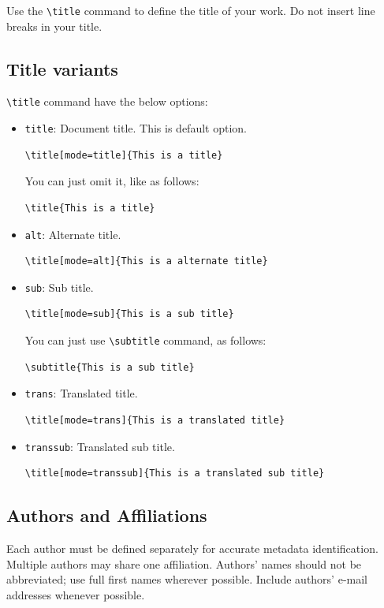 \documentclass[
]{ceurart}
\begin{document}
Use the \verb|\title| command to define the title of your work. Do not
insert line breaks in your title.

\subsection{Title variants}

\verb|\title| command have the below options:
\begin{itemize}
\item \verb|title|: Document title. This is default option. 
\begin{lstlisting}
\title[mode=title]{This is a title}
\end{lstlisting}
You can just omit it, like as follows:
\begin{lstlisting}
\title{This is a title}
\end{lstlisting}

\item \verb|alt|: Alternate title.
\begin{lstlisting}
\title[mode=alt]{This is a alternate title}
\end{lstlisting}

\item \verb|sub|: Sub title.
\begin{lstlisting}
\title[mode=sub]{This is a sub title}
\end{lstlisting}
You can just use \verb|\subtitle| command, as follows:
\begin{lstlisting}
\subtitle{This is a sub title}
\end{lstlisting}

\item \verb|trans|: Translated title.
\begin{lstlisting}
\title[mode=trans]{This is a translated title}
\end{lstlisting}

\item \verb|transsub|: Translated sub title.
\begin{lstlisting}
\title[mode=transsub]{This is a translated sub title}
\end{lstlisting}
\end{itemize}

\subsection{Authors and Affiliations}

Each author must be defined separately for accurate metadata
identification. Multiple authors may share one affiliation. Authors'
names should not be abbreviated; use full first names wherever
possible. Include authors' e-mail addresses whenever possible.
\end{document}
